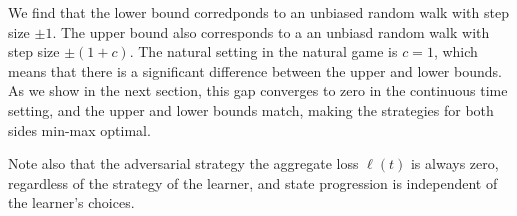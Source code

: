   We find that the lower bound corredponds to an unbiased random
  walk with step size $\pm 1$. The upper bound also corresponds to a an
  unbiasd random walk with step size $\pm(1+c)$. The natural setting
  in the natural game is $c=1$, which means that there is a
  significant difference between the upper and lower bounds. As we
  show in the next section, this gap converges to zero in the
  continuous time setting, and the upper and lower bounds match,
  making the strategies for both sides min-max optimal. 

  Note also that the adversarial strategy the aggregate loss
  $\ell(t)$ is always zero, regardless of the strategy of the
  learner, and state progression is independent of the
  learner's choices.
\fi
  \begin{figure}[t]
\begin{center}


\end{center}
\end{figure}
